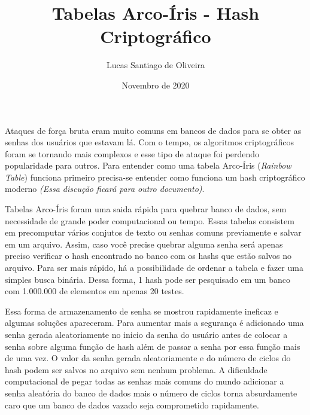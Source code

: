 \documentclass[12pt]{article}
\title{Tabelas Arco-Íris - Hash Criptográfico}
\author{Lucas Santiago de Oliveira}
\date{Novembro de 2020}
\begin{document}
\maketitle

\hspace*{4pt} Ataques de força bruta eram muito comuns em bancos de dados para se obter as senhas dos usuários que estavam lá.
Com o tempo, os algoritmos criptográficos foram se tornando mais complexos e esse tipo de ataque foi perdendo popularidade para outros.
Para entender como uma tabela Arco-Íris (\emph{Rainbow Table}) funciona primeiro precisa-se entender como funciona um hash criptográfico moderno
\emph{(Essa discução ficará para outro documento)}.

Tabelas Arco-Íris foram uma saida rápida para quebrar banco de dados, sem necessidade de grande poder computacional ou tempo. Essas tabelas consistem 
em precomputar vários conjutos de texto ou senhas comuns previamente e salvar em um arquivo. Assim, caso você precise quebrar alguma senha será apenas
preciso verificar o hash encontrado no banco com os hashs que estão salvos no arquivo. Para ser mais rápido, há a possibilidade de ordenar a tabela e
fazer uma simples busca binária. Dessa forma, 1 hash pode ser pesquisado em um banco com 1.000.000 de elementos em apenas 20 testes.

Essa forma de armazenamento de senha se mostrou rapidamente ineficaz e algumas soluções apareceram.
Para aumentar mais a segurança é adicionado uma senha gerada aleatoriamente no inicio da senha do usuário antes de colocar a senha sobre alguma função de hash além de passar
a senha por essa função mais de uma vez. O valor da senha gerada aleatoriamente e do número de ciclos do hash podem ser salvos no arquivo sem nenhum problema.
A dificuldade computacional de pegar todas as senhas mais comuns do mundo adicionar a senha aleatória do banco de dados mais o número de ciclos torna absurdamente caro
que um banco de dados vazado seja comprometido rapidamente.
\end{document}

